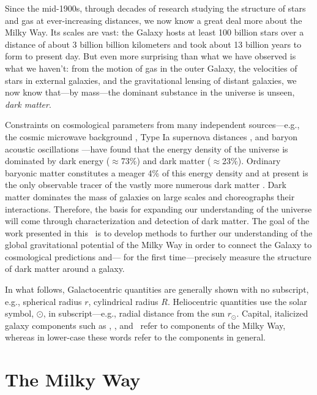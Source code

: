 Since the mid-1900s, through decades of research studying the structure of stars
and gas at ever-increasing distances, we now know a great deal more about the
Milky Way. Its scales are vast: the Galaxy hosts at least 100 billion stars over
a distance of about 3 billion billion kilometers and took about 13 billion years
to form to present day. But even more surprising than what we have observed is
what we haven't: from the motion of gas in the outer Galaxy, the velocities of
stars in external galaxies, and the gravitational lensing of distant galaxies,
we now know that---by mass---the dominant substance in the universe is unseen,
\emph{dark matter}.

Constraints on cosmological parameters from many independent sources---e.g., the
cosmic microwave background \citep{planck15}, Type Ia supernova distances
\citep{riess98, perlmutter99}, and baryon acoustic oscillations
\citep{eisenstein05}---have found that the energy density of the universe is
dominated by dark energy ($\approx$73\%) and dark matter ($\approx$23\%).
Ordinary baryonic matter constitutes a meager 4\% of this energy density and at
present is the only observable tracer of the vastly more numerous dark matter
\citep[though the search for the dark matter particle is underway;][]{aprile11,
luxdm12}. Dark matter dominates the mass of galaxies on large scales and
choreographs their interactions. Therefore, the basis for expanding our
understanding of the universe will come through characterization and detection
of dark matter. The goal of the work presented in this \article\ is to develop
methods to further our understanding of the global gravitational potential of
the Milky Way in order to connect the Galaxy to cosmological predictions and---
for the first time---precisely measure the structure of dark matter around a
galaxy.


In what follows, Galactocentric quantities are generally shown with no
subscript, e.g., spherical radius $r$, cylindrical radius $R$. Heliocentric
quantities use the solar symbol, $\odot$, in subscript---e.g., radial distance
from the sun $r_\odot$. Capital, italicized galaxy components such as \mwdisk,
\mwbulge, and \mwhalo\ refer to components of the Milky Way, whereas in
lower-case these words refer to the components in general.

\section{The Milky Way} \label{sec:milkyway}

